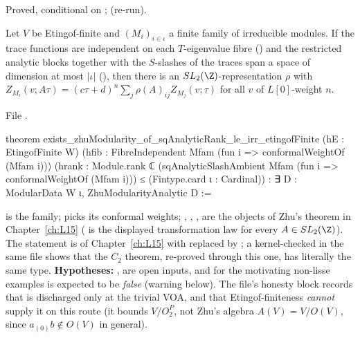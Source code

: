 \begin{status}
Proved, conditional on ; \lean{[propext, Classical.}\allowbreak{}\allowbreak\lean{sound]} (re-run).
\end{status}

\begin{theorem}\label{l16:thm:zhuEt}
Let $V$ be Etingof-finite and $(M_i)_{i\in\iota}$ a finite family of irreducible modules. If the trace functions are
independent on each $T$-eigenvalue fibre () and the restricted analytic blocks together with the $S$-slashes of
the traces span a space of dimension at most $|\iota|$ (), then there is an $SL_2(\Z)$-representation
$\rho$ with $Z_{M_i}(v;A\tau) = (c\tau+d)^n\sum_j\rho(A)_{ij}Z_{M_j}(v;\tau)$ for all $v$ of $L[0]$-weight $n$.
\end{theorem}
\noindent File .
\begin{leancode}
theorem exists_zhuModularity_of_sqAnalyticRank_le_irr_etingofFinite
    (hE : EtingofFinite W)
    (hfib : FibreIndependent Mfam (fun i => conformalWeightOf (Mfam i)))
    (hrank : Module.rank ℂ
        (sqAnalyticSlashAmbient Mfam (fun i => conformalWeightOf (Mfam i)))
      ≤ (Fintype.card ι : Cardinal)) :
    ∃ D : ModularData W ι, ZhuModularityAnalytic D :=
\end{leancode}

\begin{dictionary}
 is the family;  picks its conformal weights; ,
, ,  are the objects of Zhu's theorem in
Chapter~\ref{ch:L15} ( is the displayed transformation law for every $A\in SL_2(\Z)$).
The statement is \allowbreak{}\allowbreak{}\allowbreak{}\allowbreak{} of Chapter~\ref{ch:L15} with 
replaced by ; a kernel-checked  in the same file shows that the $C_2$ theorem, re-proved
through this one, has literally the same type. \textbf{Hypotheses:} ,  are open inputs, and for
the motivating non-lisse examples  is expected to be \emph{false} (warning below).
The file's honesty block records that  is discharged only at the trivial VOA, and that Etingof-finiteness
\emph{cannot} supply it on this route (it bounds $V/O_2^P$, not Zhu's algebra $A(V) = V/O(V)$, since $a_{(0)}b\notin O(V)$
in general).
\end{dictionary}

